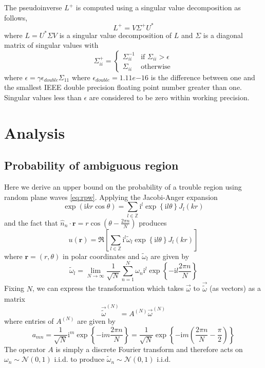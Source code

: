 \documentclass{report}
\newcommand{\rr}[0]{\mathbf{r}}
\begin{document}
The pseudoinverse $L^{+}$ is computed using a singular value decomposition as follows,
\[
L^{+} = V \Sigma^{+} U^{*}
\]
where $L = U^{*} \Sigma V$ is a singular value decomposition of $L$ and $\Sigma$ is a diagonal matrix of singular values with
\[
\Sigma^{+}_{ii} =\begin{cases}
\Sigma_{ii}^{-1} & \text{if }\Sigma_{ii} > \epsilon\\
\Sigma_{ii} & \text{otherwise}
\end{cases}
\]
where $\epsilon = \gamma \epsilon_{double} \Sigma_{11}$ where $\epsilon_{double} = 1.11e{-16}$ is the difference between one and the smallest IEEE double precision floating point number greater than one. Singular values less than $\epsilon$ are considered to be zero within working precision.


\section{Analysis}

\subsection{Probability of ambiguous region}
Here we derive an upper bound on the probability of a trouble region using random plane waves \ref{eq:rpw}. Applying the Jacobi-Anger expansion \cite{abramowitz}
\[
\exp(\mathrm{i} k r \cos \theta) = \sum_{l \in \mathbb{Z}} \mathrm{i}^{l} \exp{\left\{\mathrm{i} l \theta \right\}} J_{l}(kr)
\]
and the fact that $\hat{n}_{n} \cdot \rr = r \cos{ \left( \theta - \frac{2 \pi n}{N} \right) }$ produces
\begin{equation}
  \label{eq:rpw_bessel_expansion}
  u(\rr) = \Re \left[ \sum_{l \in \mathbb{Z}} \mathrm{i}^{l} \tilde{\omega}_{l} \exp{\left\{\mathrm{i} l \theta \right\}} J_{l}(kr) \right]
\end{equation}
where $\rr = (r, \theta)$ in polar coordinates and $\tilde{\omega}_{l}$ are given by
\[
\tilde{\omega}_{l} = \lim_{N \rightarrow \infty} \frac{1}{\sqrt{N}} \sum_{n=1}^{N} \omega_{n} \mathrm{i}^{l} \exp{\left\{-\mathrm{i} l \frac{2 \pi n}{N} \right\}}
\]
Fixing $N$, we can express the transformation which takes $\overrightarrow{\omega}$ to $\overrightarrow{\tilde{\omega}}$ (as vectors) as a matrix
\[
\overrightarrow{\tilde{\omega}}^{(N)} = A^{(N)} \overrightarrow{\omega}^{(N)}
\]
where entries of $A^{(N)}$ are given by
\[
a_{mn} = \frac{1}{\sqrt{N}} \mathrm{i}^{m} \exp{\left\{-\mathrm{i} m \frac{2 \pi n}{N} \right\}} = \frac{1}{\sqrt{N}} \exp{\left\{-\mathrm{i} m \left(\frac{2 \pi n}{N} - \frac{\pi}{2}\right) \right\}} 
\]
The operator $A$ is simply a discrete Fourier transform and therefore acts on $\omega_{n} \sim \mathcal{N}(0,1)$ i.i.d. to produce $\tilde{\omega}_{n} \sim \mathcal{N}(0, 1)$ i.i.d.
\end{document}
